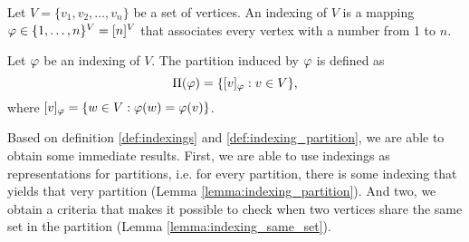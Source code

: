 \begin{definition}
    Let $V = \{ v_1,v_2,\dots, v_n \}$ be a set of vertices. An indexing of $V$ is a mapping $\varphi \in \{ 1,\dots,n \}^V = [n]^V$ that associates every vertex with a number from 1 to $n$. \label{def:indexings}
\end{definition}

\begin{definition}
    Let $\varphi$ be an indexing of $V$. The partition induced by $\varphi$ is defined as
    \begin{equation}
        \Pi(\varphi)= \{ [v]_\varphi : v \in V \}, \label{eq:indexing}
    \end{equation}
    where $[v]_\varphi = \{ w \in V : \varphi(w) = \varphi(v) \}$. \label{def:indexing_partition}
\end{definition}

Based on definition \ref{def:indexings} and \ref{def:indexing_partition}, we are able to obtain some immediate results. First, we are able to use indexings as representations for partitions, i.e. for every partition, there is some indexing that yields that very partition (Lemma \ref{lemma:indexing_partition}). And two, we obtain a criteria that makes it possible to check when two vertices share the same set in the partition (Lemma \ref{lemma:indexing_same_set}).  

